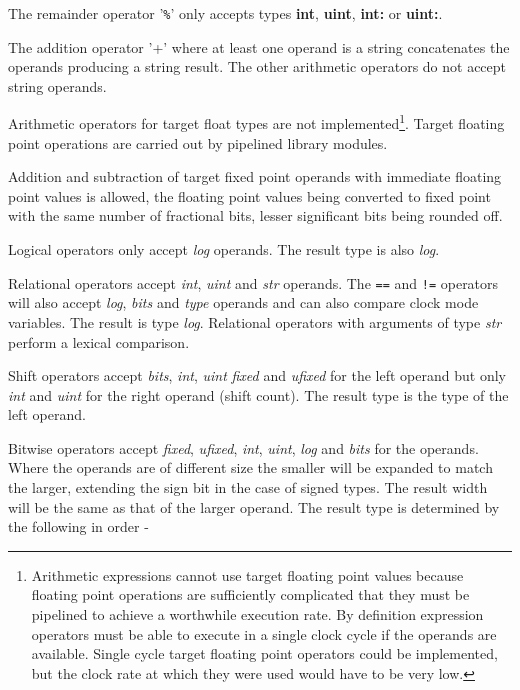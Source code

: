             The remainder operator '\verb"%"' only accepts types {\bf int}, {\bf
            uint}, {\bf int:} or {\bf uint:}.

            The addition operator '+' where at least one operand is a string
            concatenates the operands producing a string result. The other
            arithmetic operators do not accept string operands.

            Arithmetic operators for target float types are not
            implemented\footnote{Arithmetic expressions cannot use target
            floating point values because floating point operations are
            sufficiently complicated that they must be pipelined to achieve a
            worthwhile execution rate. By definition expression operators must
            be able to execute in a single clock cycle if the operands are
            available. Single cycle target floating point operators could be
            implemented, but the clock rate at which they were used would have
            to be very low.}. Target floating point operations are carried out
            by pipelined library modules.
            
            Addition and subtraction of target fixed point operands with
            immediate floating point values is allowed, the floating point
            values being converted to fixed point with the same number of
            fractional bits, lesser significant bits being rounded off.

            Logical operators only accept {\em log} operands. The result type is
            also {\em log}.

            Relational operators accept {\em int}, {\em uint} and {\em str}
            operands. The \verb'==' and \verb'!=' operators will also accept
            {\em log}, {\em bits} and {\em type} operands and can also compare
            clock mode variables. The result is type {\em log}. Relational
            operators with arguments of type {\em str} perform a lexical
            comparison.

            Shift operators accept {\em bits}, {\em int}, {\em uint} {\em
            fixed} and {\em ufixed} for the left operand but only {\em int} and
            {\em uint} for the right operand (shift count). The result type is
            the type of the left operand.

            Bitwise operators accept {\em fixed}, {\em ufixed}, {\em int}, {\em
            uint}, {\em log} and {\em bits} for the operands. Where the
            operands are of different size the smaller will be expanded to match
            the larger, extending the sign bit in the case of signed types. The
            result width will be the same as that of the larger operand. The
            result type is determined by the following in order -
            
